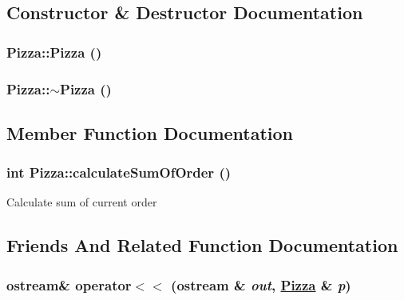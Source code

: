 \subsection{Constructor \& Destructor Documentation}
\hypertarget{class_pizza_700ffe7c4bc34e2c456faa65be04ce6b}{
\subsubsection[Pizza]{\setlength{\rightskip}{0pt plus 5cm}Pizza::Pizza ()}}
\label{class_pizza_700ffe7c4bc34e2c456faa65be04ce6b}


\hypertarget{class_pizza_db2d5b1b2bb633c9f11923d807750a83}{
\subsubsection[$\sim$Pizza]{\setlength{\rightskip}{0pt plus 5cm}Pizza::$\sim$Pizza ()}}
\label{class_pizza_db2d5b1b2bb633c9f11923d807750a83}




\subsection{Member Function Documentation}
\hypertarget{class_pizza_24b9bb5302a251b41fed3df1fb7ce8ad}{
\subsubsection[calculateSumOfOrder]{\setlength{\rightskip}{0pt plus 5cm}int Pizza::calculate\-Sum\-Of\-Order ()}}
\label{class_pizza_24b9bb5302a251b41fed3df1fb7ce8ad}


Calculate sum of current order 

\subsection{Friends And Related Function Documentation}
\hypertarget{class_pizza_6234ace0cc7b9a861bdeecd0223d6b69}{
\subsubsection[operator$<$$<$]{\setlength{\rightskip}{0pt plus 5cm}ostream\& operator$<$$<$ (ostream \& {\em out}, \hyperlink{class_pizza}{Pizza} \& {\em p})}}
\label{class_pizza_6234ace0cc7b9a861bdeecd0223d6b69}




